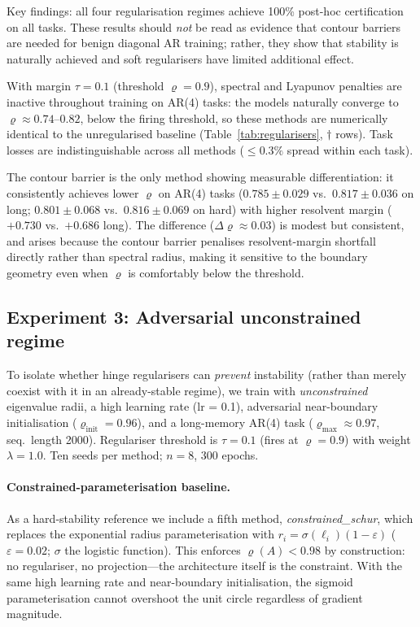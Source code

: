 \documentclass{article}
\theoremstyle{definition}
\begin{document}
Key findings: all four regularisation regimes achieve 100\% post-hoc
certification on all tasks.  These results should \emph{not} be read as
evidence that contour barriers are needed for benign diagonal AR
training; rather, they show that stability is naturally achieved and soft
regularisers have limited additional effect.

With margin $\tau=0.1$ (threshold $\varrho=0.9$), spectral and Lyapunov
penalties are inactive throughout training on AR(4) tasks: the models
naturally converge to $\varrho\approx0.74$--$0.82$, below the firing
threshold, so these methods are numerically identical to the unregularised
baseline (Table~\ref{tab:regularisers}, $\dagger$ rows).  Task losses are
indistinguishable across all methods ($\leq 0.3\%$ spread within each
task).

The contour barrier is the only method showing measurable differentiation:
it consistently achieves lower $\varrho$ on AR(4) tasks
($0.785\pm0.029$ vs.\ $0.817\pm0.036$ on long;
 $0.801\pm0.068$ vs.\ $0.816\pm0.069$ on hard)
with higher resolvent margin ($+0.730$ vs.\ $+0.686$ long).  The
difference ($\Delta\varrho\approx0.03$) is modest but consistent, and
arises because the contour barrier penalises resolvent-margin shortfall
directly rather than spectral radius, making it sensitive to the boundary
geometry even when $\varrho$ is comfortably below the threshold.

\subsection{Experiment 3: Adversarial unconstrained regime}
\label{sec:exp3}

To isolate whether hinge regularisers can \emph{prevent} instability
(rather than merely coexist with it in an already-stable regime), we
train with \emph{unconstrained} eigenvalue radii, a high learning rate
(lr = 0.1), adversarial near-boundary initialisation ($\varrho_{\mathrm{init}} = 0.96$),
and a long-memory AR(4) task ($\varrho_{\max} \approx 0.97$, seq.\ length 2000).
Regulariser threshold is $\tau = 0.1$ (fires at $\varrho = 0.9$) with weight
$\lambda = 1.0$.  Ten seeds per method; $n = 8$, 300 epochs.

\paragraph{Constrained-parameterisation baseline.}
As a hard-stability reference we include a fifth method,
\emph{constrained\_schur}, which replaces the exponential radius
parameterisation with $r_i = \sigma(\ell_i)(1-\varepsilon)$
($\varepsilon = 0.02$; $\sigma$ the logistic function).  This enforces
$\varrho(A) < 0.98$ by construction: no regulariser, no projection---the
architecture itself is the constraint.  With the same high learning rate
and near-boundary initialisation, the sigmoid parameterisation cannot
overshoot the unit circle regardless of gradient magnitude.
\end{document}
